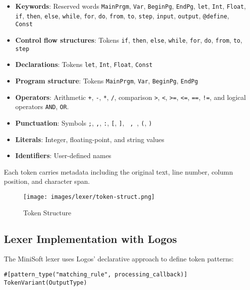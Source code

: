 \documentclass[12pt,a4paper]{article}
\begin{document}
\begin{itemize}
	\item \textbf{Keywords}: Reserved words \texttt{MainPrgm}, \texttt{Var}, \texttt{BeginPg}, \texttt{EndPg}, \texttt{let}, \texttt{Int}, \texttt{Float}, \texttt{if}, \texttt{then}, \texttt{else}, \texttt{while}, \texttt{for}, \texttt{do}, \texttt{from}, \texttt{to}, \texttt{step}, \texttt{input}, \texttt{output}, \texttt{@define}, \texttt{Const}
	\item \textbf{Control flow structures}: Tokens \texttt{if}, \texttt{then}, \texttt{else}, \texttt{while}, \texttt{for}, \texttt{do}, \texttt{from}, \texttt{to}, \texttt{step}
	\item \textbf{Declarations}: Tokens \texttt{let}, \texttt{Int}, \texttt{Float}, \texttt{Const}
	\item \textbf{Program structure}: Tokens \texttt{MainPrgm}, \texttt{Var}, \texttt{BeginPg}, \texttt{EndPg}
	\item \textbf{Operators}: Arithmetic \texttt{+}, \texttt{-}, \texttt{*}, \texttt{/}, comparison \texttt{>}, \texttt{<}, \texttt{>=}, \texttt{<=}, \texttt{==}, \texttt{!=}, and logical operators \texttt{AND}, \texttt{OR}.
	\item \textbf{Punctuation}: Symbols \texttt{;}, \texttt{,}, \texttt{:}, \texttt{[}, \texttt{]}, \texttt{{} , \texttt{}}, \texttt{(}, \texttt{)}
	\item \textbf{Literals}: Integer, floating-point, and string values
	\item \textbf{Identifiers}: User-defined names
\end{itemize}

Each token carries metadata including the original text, line number, column position, and character span.


\begin{figure}[H]
	\centering
	\texttt{[image: images/lexer/token-struct.png]}
	\caption{Token Structure}
\end{figure}

\subsection{Lexer Implementation with Logos}
The MiniSoft lexer uses Logos' declarative approach to define token patterns:

\begin{lstlisting}[caption={Logos Token Definitions Syntax}]
#[pattern_type("matching_rule", processing_callback)]
TokenVariant(OutputType)
\end{lstlisting}
\end{document}
